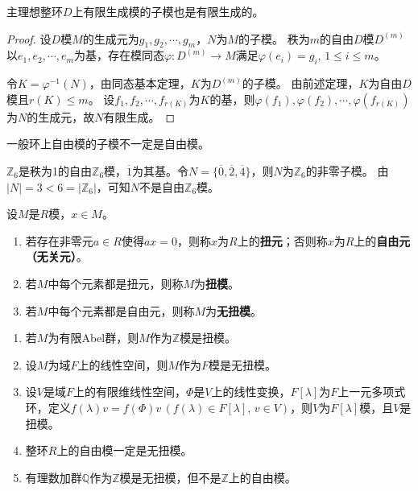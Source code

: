 \documentclass[../../main.tex]{subfiles}%
\begin{document}
\begin{corollary}
主理想整环$D$上有限生成模的子模也是有限生成的。
\end{corollary}
\begin{proof}

设$D$模$M$的生成元为$g_1,g_2,\cdots,g_m$，$N$为$M$的子模。
秩为$m$的自由$D$模$D^{(m)}$以$e_1,e_2,\cdots,e_m$为基，存在模同态$\varphi:D^{(m)}\to M$满足$\varphi(e_i)=g_i,\,1\leqslant i\leqslant m$。

令$K=\varphi^{-1}(N)$，由同态基本定理，$K$为$D^{(m)}$的子模。
由前述定理，$K$为自由$D$模且$r(K)\leqslant m$。
设$f_1,f_2,\cdots,f_{r(K)}$为$K$的基，则$\varphi(f_1),\varphi(f_2),\cdots,\varphi(f_{r(K)})$为$N$的生成元，故$N$有限生成。

\end{proof}

\begin{remark}
一般环上自由模的子模不一定是自由模。
\end{remark}

\begin{example}
$\mathbb{Z}_6$是秩为1的自由$\mathbb{Z}_6$模，$\overline{1}$为其基。令$N=\{\overline{0},\overline{2},\overline{4}\}$，则$N$为$\mathbb{Z}_6$的非零子模。
由$|N|=3<6=|\mathbb{Z}_6|$，可知$N$不是自由$\mathbb{Z}_6$模。
\end{example}

\begin{definition}
设$M$是$R$模，$x\in M$。
\begin{enumerate}[(1)]
\item 若存在非零元$a\in R$使得$ax=0$，则称$x$为$R$上的\textbf{扭元}；否则称$x$为$R$上的\textbf{自由元（无关元）}。
\item 若$M$中每个元素都是扭元，则称$M$为\textbf{扭模}。
\item 若$M$中每个元素都是自由元，则称$M$为\textbf{无扭模}。
\end{enumerate}
\end{definition}

\begin{examples}
\begin{enumerate}[(1)]
\item 若$M$为有限Abel群，则$M$作为$\mathbb{Z}$模是扭模。
\item 设$M$为域$F$上的线性空间，则$M$作为$F$模是无扭模。
\item 设$V$是域$F$上的有限维线性空间，$\Phi$是$V$上的线性变换，$F[\lambda]$为$F$上一元多项式环，定义$f(\lambda)v=f(\Phi)v\,(f(\lambda)\in F[\lambda],\,v\in V)$，则$V$为$F[\lambda]$模，且$V$是扭模。
\item 整环$R$上的自由模一定是无扭模。
\item 有理数加群$\mathbb{Q}$作为$\mathbb{Z}$模是无扭模，但不是$\mathbb{Z}$上的自由模。
\end{enumerate}
\end{examples}
\end{document}
